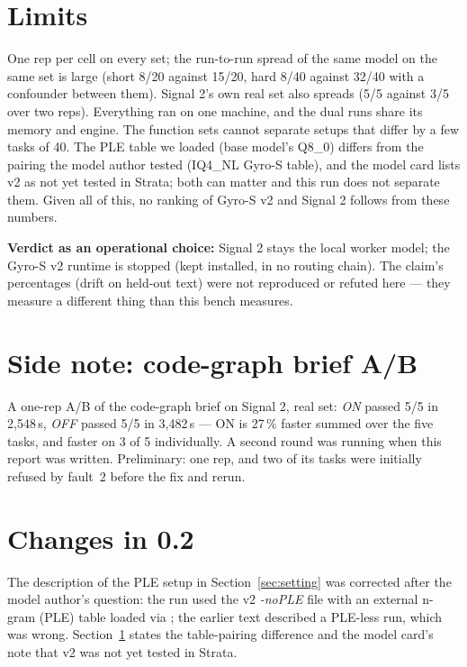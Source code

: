 \section{Limits}\label{sec:limits}

One rep per cell on every set; the run-to-run spread of the same model on the same set is large (short 8/20 against
15/20, hard 8/40 against 32/40 with a confounder between them). Signal 2's own real set also spreads (5/5 against
3/5 over two reps). Everything ran on one machine, and the dual runs share its memory and engine. The function sets
cannot separate setups that differ by a few tasks of 40. The PLE table we loaded (base model's Q8\_0) differs from the
pairing the model author tested (IQ4\_NL Gyro-S table), and the model card lists v2 as not yet tested in Strata; both
can matter and this run does not separate them. Given all of this, no ranking of Gyro-S v2 and Signal 2
follows from these numbers.

\textbf{Verdict as an operational choice:} Signal 2 stays the local worker model; the Gyro-S v2 runtime is stopped
(kept installed, in no routing chain). The claim's percentages (drift on held-out text) were not reproduced or
refuted here --- they measure a different thing than this bench measures.

\section{Side note: code-graph brief A/B}\label{sec:codegraph}

A one-rep A/B of the code-graph brief on Signal 2, real set: \emph{ON} passed 5/5 in 2{,}548\,s, \emph{OFF} passed
5/5 in 3{,}482\,s --- ON is 27\,\% faster summed over the five tasks, and faster on 3 of 5 individually. A second
round was running when this report was written. Preliminary: one rep, and two of its tasks were initially refused by
fault~2 before the fix and rerun.

\clearpage
{}
{}
\printbibliography[title={References}]

\section*{Changes in 0.2}
The description of the PLE setup in Section~\ref{sec:setting} was corrected after the model author's question: the run
used the v2 \emph{-noPLE} file with an external n-gram (PLE) table loaded via ; the earlier text
described a PLE-less run, which was wrong. Section~\ref{sec:limits} states the table-pairing difference and the model card's note that v2 was not yet
tested in Strata.


